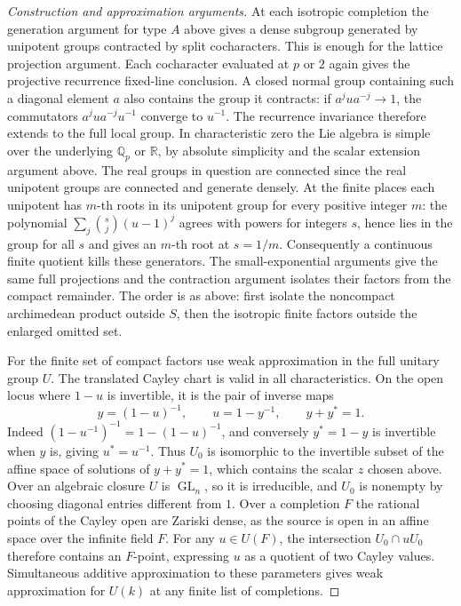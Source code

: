 \documentclass[11pt,a4paper,openany,oneside]{book}
\theoremstyle{resultstyle}
\theoremstyle{definition}
\numberwithin{equation}{chapter}
\begin{document}
\begin{proof}[Construction and approximation arguments]
At each isotropic completion the generation argument for
type \(A\) above gives a dense subgroup generated by
unipotent groups contracted by split cocharacters. This
is enough for the lattice projection argument. Each
cocharacter evaluated at \(p\) or \(2\) again gives
the projective recurrence fixed-line conclusion. A
closed normal group containing such a diagonal element
\(a\) also contains the group it contracts: if
\(a^j u a^{-j}\to1\), the commutators
\(a^j u a^{-j}u^{-1}\) converge to \(u^{-1}\).
The recurrence invariance therefore extends to the full
local group. In characteristic zero the Lie algebra
is simple over the underlying \(\mathbb Q_p\) or
\(\mathbb R\), by absolute simplicity and the scalar
extension argument above. The real groups in question
are connected since the real unipotent groups are
connected and generate densely. At the finite places
each unipotent has \(m\)-th roots in its unipotent
group for every positive integer \(m\): the polynomial
\(\sum_j\binom{s}{j}(u-1)^j\) agrees with powers for
integers \(s\), hence lies in the group for all \(s\)
and gives an \(m\)-th root at \(s=1/m\).
Consequently a continuous finite quotient kills these
generators. The small-exponential arguments give the
same full projections and the contraction argument
isolates their factors from the compact remainder.
The order is as above: first isolate the noncompact
archimedean product outside \(S\), then the isotropic
finite factors outside the enlarged omitted set.

For the finite set of compact factors use weak
approximation in the full unitary group \(U\).
The translated Cayley chart is valid in all
characteristics. On the open locus where \(1-u\)
is invertible, it is the pair of inverse maps
\[
 y=(1-u)^{-1},\qquad u=1-y^{-1},
 \qquad y+y^\ast=1 .
\]
Indeed \((1-u^{-1})^{-1}=1-(1-u)^{-1}\), and
conversely \(y^\ast=1-y\) is invertible when \(y\)
is, giving \(u^\ast=u^{-1}\). Thus \(U_0\) is
isomorphic to the invertible subset of the affine
space of solutions of \(y+y^\ast=1\), which contains
the scalar \(z\) chosen above. Over an algebraic
closure \(U\) is \(\operatorname{GL}_n\), so it is
irreducible, and \(U_0\) is nonempty by choosing
diagonal entries different from \(1\). Over a completion \(F\) the
rational points of the Cayley open are Zariski dense,
as the source is open in an affine space over the
infinite field \(F\). For any \(u\in U(F)\), the
intersection \(U_0\cap uU_0\) therefore contains an
\(F\)-point, expressing \(u\) as a quotient of two
Cayley values. Simultaneous additive approximation
to these parameters gives weak approximation for
\(U(k)\) at any finite list of completions.


\end{proof}
\end{document}
